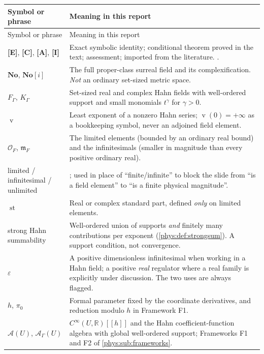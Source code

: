 \documentclass[11pt,letterpaper]{article}
\numberwithin{equation}{section}
\theoremstyle{definition}
\theoremstyle{remark}
\newcommand{\No}{\mathbf{No}}
\newcommand{\SC}{\mathbf{No}[i]}
\newcommand{\R}{\mathbb R}
\newcommand{\eps}{\varepsilon}
\newcommand{\Ofin}{\mathcal O}
\newcommand{\mm}{\mathfrak m}
\newcommand{\Alg}{\mathcal A}
\DeclareMathOperator{\st}{st}
\DeclareMathOperator{\val}{v}
\newcommand{\TE}{\textcolor{TierE}{\textsf{\bfseries[E]}}}
\newcommand{\TC}{\textcolor{TierC}{\textsf{\bfseries[C]}}}
\newcommand{\TA}{\textcolor{TierA}{\textsf{\bfseries[A]}}}
\newcommand{\TI}{\textcolor{TierI}{\textsf{\bfseries[I]}}}
\begin{document}
\begin{longtable}{@{}L{0.21\textwidth}L{0.73\textwidth}@{}}
\toprule
Symbol or phrase & Meaning in this report \\
\midrule
\endfirsthead
\toprule Symbol or phrase & Meaning in this report \\ \midrule
\endhead
\bottomrule
\endfoot
\TE, \TC, \TA, \TI &
Exact symbolic identity; conditional theorem proved in the text; assessment;
imported from the literature. . \\
\addlinespace
$\No$, $\SC$ &
The full proper-class surreal field and its complexification. \emph{Not} an
ordinary set-sized metric space. \\
\addlinespace
$F_{\Gamma}$, $K_{\Gamma}$ &
Set-sized real and complex Hahn fields with well-ordered support and small
monomials $t^{\gamma}$ for $\gamma>0$. \\
\addlinespace
$\val$ &
Least exponent of a nonzero Hahn series; $\val(0)=+\infty$ as a bookkeeping
symbol, never an adjoined field element. \\
\addlinespace
$\Ofin_{F}$, $\mm_{F}$ &
The limited elements (bounded by an ordinary real bound) and the infinitesimals
(smaller in magnitude than every positive ordinary real). \\
\addlinespace
limited / infinitesimal / unlimited &
; used in place of ``finite/infinite'' to block the
slide from ``is a field element'' to ``is a finite physical magnitude''. \\
\addlinespace
$\st$ &
Real or complex standard part, defined \emph{only} on limited elements. \\
\addlinespace
strong Hahn summability &
Well-ordered union of supports \emph{and} finitely many contributions per
exponent (\cref{phys:def:strongsum}). A support condition, not convergence. \\
\addlinespace
$\eps$ &
A positive dimensionless infinitesimal when working in a Hahn field; a positive
\emph{real} regulator where a real family is explicitly under discussion. The
two uses are always flagged. \\
\addlinespace
$h$, $\pi_{0}$ &
Formal parameter fixed by the coordinate derivatives, and reduction modulo $h$
in Framework F1. \\
\addlinespace
$\Alg(U)$, $\Alg_{\Gamma}(U)$ &
$C^{\infty}(U,\R)[[h]]$ and the Hahn coefficient-function algebra with global
well-ordered support; Frameworks F1 and F2 of \cref{phys:sub:frameworks}. \\

\end{longtable}
\end{document}
